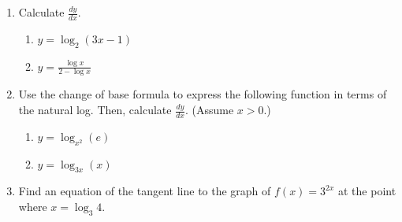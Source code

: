\documentclass[12pt]{article}
\newif\ifans
\begin{document}
\begin{enumerate}
\item Calculate $\frac{dy}{dx}$.

\begin{enumerate}

\item $y = \log_{2}{(3x-1)}$ 

\ifans{\fbox{$\frac{3}{(3x-1)\ln2}$}} \fi

\item $y=\frac{\log{x}}{2-\log{x}}$

\ifans{\fbox{$\frac{2}{x\ln{(10)}(2-\log{x})^2}$}} \fi

\end{enumerate}

\item Use the change of base formula to express the following function in terms of the natural log.  Then, calculate $\frac{dy}{dx}$.  (Assume $x>0$.)

\begin{enumerate}

\item $y=\log_{x^2}{(e)}$

\ifans{\fbox{$y=\frac{1}{2\ln{x}}$; $\frac{dy}{dx}=-\frac{1}{2x(\ln{x})^2}$}} \fi

\item $y = \log_{3x}{(x)}$ 

\ifans{\fbox{$y=\frac{\ln{x}}{\ln{3x}} $; $\frac{dy}{dx}=\frac{\ln{3}}{x(\ln{3x})^2}$}} \fi

\end{enumerate}

\item Find an equation of the tangent line to the graph of $f(x)=3^{2x}$ at the point where $x=\log_3{4}$.

\ifans\fbox{$y-16=32(\ln{3})(x-\log_{3}4)$} \fi

\end{enumerate}
\end{document}
